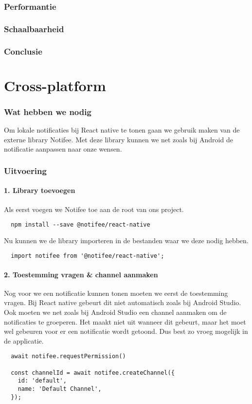 \subsubsection{Performantie}

\subsubsection{Schaalbaarheid}

\subsubsection{Conclusie}


\section{Cross-platform}
\subsubsection{Wat hebben we nodig}
Om lokale notificaties bij React native te tonen gaan we gebruik maken van de externe library Notifee.
Met deze library kunnen we net zoals bij Android de notificatie aanpassen naar onze wensen.

\subsubsection{Uitvoering}
\paragraph{1. Library toevoegen}
Als eerst voegen we Notifee toe aan de root van ons project.
\begin{verbatim}
  npm install --save @notifee/react-native
\end{verbatim}
Nu kunnen we de library importeren in de bestanden waar we deze nodig hebben.
\begin{verbatim}
  import notifee from '@notifee/react-native';
\end{verbatim}

\paragraph{2. Toestemming vragen \& channel aanmaken}
Nog voor we een notificatie kunnen tonen moeten we eerst de toestemming vragen. Bij React native 
gebeurt dit niet automatisch zoals bij Android Studio. Ook moeten we net zoals bij Android Studio 
een channel aanmaken om de notificaties te groeperen. Het maakt niet uit wanneer dit gebeurt, maar 
het moet wel gebeuren voor er een notificatie wordt getoond. Dus best zo vroeg mogelijk in de applicatie.
\begin{verbatim}
  await notifee.requestPermission()

  const channelId = await notifee.createChannel({
    id: 'default',
    name: 'Default Channel',
  });
\end{verbatim}

